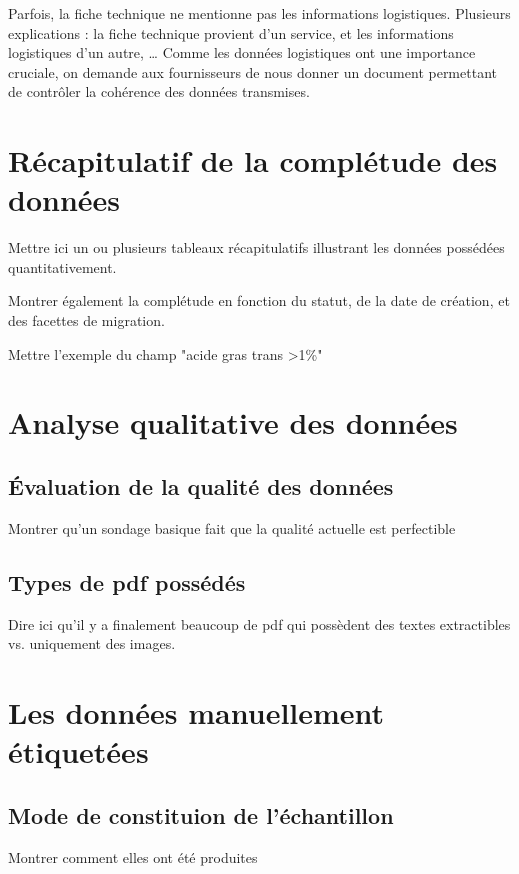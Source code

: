             Parfois, la fiche technique ne mentionne pas les informations logistiques.
            Plusieurs explications : la fiche technique provient d'un service, et les informations logistiques d'un autre, \dots
            Comme les données logistiques ont une importance cruciale, on demande aux fournisseurs de nous donner un document permettant de contrôler la cohérence des données transmises.

        \section{Récapitulatif de la complétude des données}

        Mettre ici un ou plusieurs tableaux récapitulatifs illustrant les données possédées quantitativement.

        Montrer également la complétude en fonction du statut, de la date de création, et des facettes de migration.

        Mettre l'exemple du champ "acide gras trans >1\%"

        \section{Analyse qualitative des données}
        
            \subsection{\'{E}valuation de la qualité des données}
        Montrer qu'un sondage basique fait que la qualité actuelle est perfectible


            \subsection{Types de pdf possédés}
        Dire ici qu'il y a finalement beaucoup de pdf qui possèdent des textes extractibles vs. uniquement des images.

        \section{Les données \og manuellement étiquetées \fg}
        \label{manually_labelled_data}

            \subsection{Mode de constituion de l'échantillon}
            Montrer comment elles ont été produites

